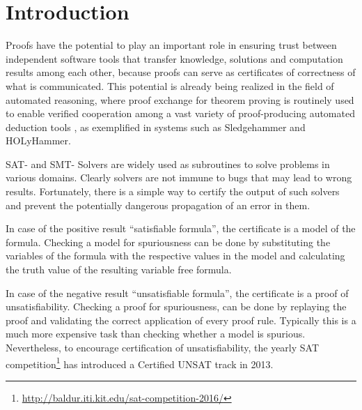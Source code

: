 \section{Introduction}

Proofs have the potential to play an important role in ensuring trust
between independent software tools that transfer knowledge, solutions
and computation results among each other, because proofs can serve as
certificates of correctness of what is communicated. This potential is
already being realized in the field of automated reasoning, where
proof exchange for theorem proving
\cite{PxTP2013,PxTP2015} is routinely used to
enable verified cooperation among a vast variety of proof-producing
automated deduction tools \cite{APPA}, as exemplified in systems such
as Sledgehammer \cite{paulson2010three} and
HOLyHammer\cite{zbMATH06419295}. 

SAT- and SMT- Solvers are widely used as subroutines to solve problems in various domains.
Clearly solvers are not immune to bugs \cite{brummayer2009fuzzing,brummayer2010automated} that may lead to wrong results.
Fortunately, there is a simple way to certify the output of such solvers and 
prevent the potentially dangerous propagation of an error in them.

In case of the positive result ``satisfiable formula'', the certificate is a model of the formula.
Checking a model for spuriousness can be done by substituting the variables of the formula with the respective values in the model and 
calculating the truth value of the resulting variable free formula.

In case of the negative result ``unsatisfiable formula'', the certificate is a proof of unsatisfiability.
Checking a proof for spuriousness, can be done by replaying the proof and validating the correct application of every proof rule.
Typically this is a much more expensive task than checking whether a model is spurious.
Nevertheless, to encourage certification of unsatisfiability, the yearly SAT competition\footnote{\url{http://baldur.iti.kit.edu/sat-competition-2016/}} has introduced a Certified UNSAT track in 2013.

